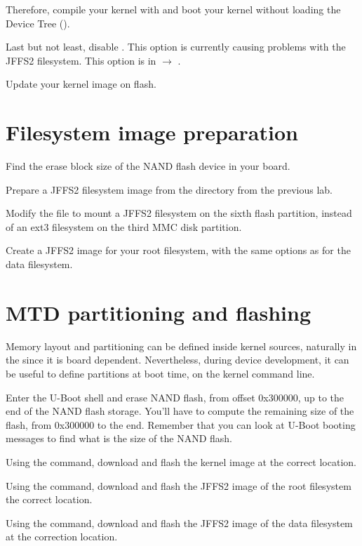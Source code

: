 Therefore, compile your kernel with  and
boot your kernel without loading the Device Tree ().

Last but not least, disable . This option is
currently causing problems with the JFFS2 filesystem. This option is
in  $\rightarrow$
.

Update your kernel image on flash.

\section{Filesystem image preparation}

Find the erase block size of the NAND flash device in your board.

Prepare a JFFS2 filesystem image from the 
directory from the previous lab.

Modify the  file to mount a JFFS2 filesystem on
the sixth flash partition, instead of an ext3 filesystem on the third
MMC disk partition.

Create a JFFS2 image for your root filesystem, with the same options
as for the data filesystem.

\section{MTD partitioning and flashing}

Memory layout and partitioning can be defined inside kernel sources,
naturally in the  since it is
board dependent. Nevertheless, during device development, it can be
useful to define partitions at boot time, on the kernel command line.

Enter the U-Boot shell and erase NAND flash, from offset 0x300000,
up to the end of the NAND flash storage. You'll have to compute the
remaining size of the flash, from 0x300000 to the end. Remember that
you can look at U-Boot booting messages to find what is the size of
the NAND flash.

Using the  command, download and flash the kernel image at
the correct location.

Using the  command, download and flash the JFFS2 image
of the root filesystem the correct location.

Using the  command, download and flash the JFFS2 image of the
data filesystem at the correction location.

